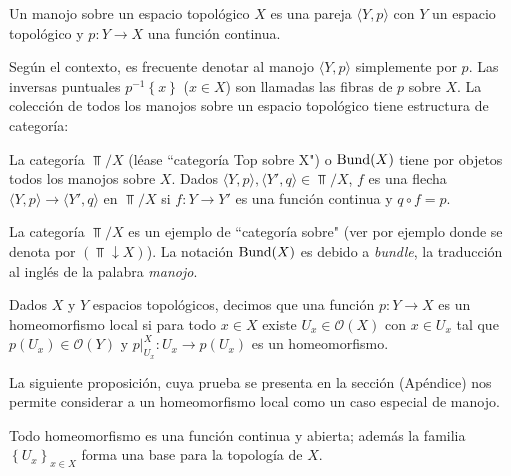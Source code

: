 \begin{Def}[Manojo]
    Un manojo sobre un espacio topológico $X$ es una pareja $\langle Y, p\rangle$ con $Y$ un espacio topológico y $p:Y\to X$ una función continua.
\end{Def}
Según el contexto, es frecuente denotar al manojo $\langle Y,p\rangle$ simplemente por $p$. Las inversas puntuales $p^{-1}\left\lbrace x\right\rbrace$ ($x\in X$) son llamadas las fibras de $p$ sobre $X$. La colección de todos los manojos sobre un espacio topológico tiene estructura de categoría:
\begin{Def}
   La categoría $\Top /X$ (léase ``categoría Top sobre X") o $\normalfont{\text{Bund}} (X)$ tiene por objetos todos los manojos sobre $X$. Dados $\langle Y,p\rangle,\langle Y',q\rangle\in \Top/X$, $f$ es una flecha $\langle Y,p\rangle\to\langle Y',q\rangle$ en $\Top/X$ si $f:Y\to Y'$ es una función continua y $q\circ f=p$.
   
\end{Def}
La categoría $\Top /X$ es un ejemplo de ``categoría sobre" (ver por ejemplo \cite[p.~45]{CWM} donde se denota por $(\Top\downarrow X)$). La notación $\normalfont{\text{Bund}} (X)$ es debido a \textit{bundle}, la traducción al inglés de la palabra \textit{manojo}. 
\begin{Def}
   Dados $X$ y $Y$ espacios topológicos, decimos que una función $p:Y\to X$ es un homeomorfismo local si para todo $x\in X$ existe $U_x\in \mathcal{O}(X)$ con $x\in U_x$ tal que $p(U_x)\in\mathcal{O} (Y)$ y $p|^{X}_{U_x}:U_x\to p(U_x)$ es un homeomorfismo. 
\end{Def}
La siguiente proposición, cuya prueba se presenta en la sección  (Apéndice) nos permite considerar a un homeomorfismo local como un caso especial de manojo.
\begin{Prop}
   Todo homeomorfismo es una función continua y abierta; además la familia $\left\lbrace U_x\right\rbrace_{x\in X}$ forma una base para la topología de $X$.
\end{Prop}
